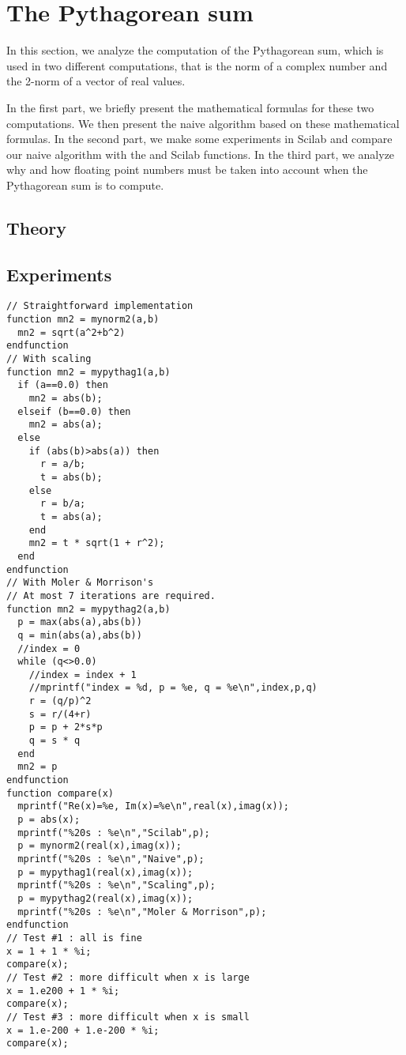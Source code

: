 %

\section{The Pythagorean sum}

In this section, we analyze the computation of the Pythagorean sum,
which is used in two different computations, that is the norm of a complex
number and the 2-norm of a vector of real values.

In the first part, we briefly present the mathematical formulas for these 
two computations.
We then present the naive algorithm based on these mathematical formulas. 
In the second part, we make some experiments in Scilab and compare our
naive algorithm with the  and  Scilab functions.
In the third part, we analyze 
why and how floating point numbers must be taken into account when the 
Pythagorean sum is to compute.

\subsection{Theory}

\subsection{Experiments}


\lstset{language=scilabscript}
\begin{lstlisting}
// Straightforward implementation
function mn2 = mynorm2(a,b)
  mn2 = sqrt(a^2+b^2)
endfunction
// With scaling
function mn2 = mypythag1(a,b)
  if (a==0.0) then
    mn2 = abs(b);
  elseif (b==0.0) then
    mn2 = abs(a);
  else
    if (abs(b)>abs(a)) then
      r = a/b;
      t = abs(b);
    else
      r = b/a;
      t = abs(a);
    end
    mn2 = t * sqrt(1 + r^2);
  end
endfunction
// With Moler & Morrison's
// At most 7 iterations are required.
function mn2 = mypythag2(a,b)
  p = max(abs(a),abs(b))
  q = min(abs(a),abs(b))
  //index = 0
  while (q<>0.0)
    //index = index + 1
    //mprintf("index = %d, p = %e, q = %e\n",index,p,q)
    r = (q/p)^2
    s = r/(4+r)
    p = p + 2*s*p
    q = s * q
  end
  mn2 = p
endfunction
function compare(x)
  mprintf("Re(x)=%e, Im(x)=%e\n",real(x),imag(x));
  p = abs(x);
  mprintf("%20s : %e\n","Scilab",p);
  p = mynorm2(real(x),imag(x));
  mprintf("%20s : %e\n","Naive",p);
  p = mypythag1(real(x),imag(x));
  mprintf("%20s : %e\n","Scaling",p);
  p = mypythag2(real(x),imag(x));
  mprintf("%20s : %e\n","Moler & Morrison",p);
endfunction
// Test #1 : all is fine
x = 1 + 1 * %i;
compare(x);
// Test #2 : more difficult when x is large
x = 1.e200 + 1 * %i;
compare(x);
// Test #3 : more difficult when x is small
x = 1.e-200 + 1.e-200 * %i;
compare(x);
\end{lstlisting}

